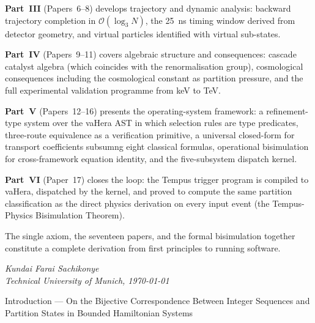 \documentclass[12pt,a4paper,openany]{book}
\begin{document}
\textbf{Part~III} (Papers~6--8) develops trajectory and dynamic analysis:
backward trajectory completion in $\mathcal{O}(\log_3 N)$, the 25~ns
timing window derived from detector geometry, and virtual particles
identified with virtual sub-states.

\textbf{Part~IV} (Papers~9--11) covers algebraic structure and
consequences: cascade catalyst algebra (which coincides with the
renormalisation group), cosmological consequences including the
cosmological constant as partition pressure, and the full experimental
validation programme from keV to TeV.

\textbf{Part~V} (Papers~12--16) presents the operating-system framework:
a refinement-type system over the vaHera AST in which selection rules are
type predicates, three-route equivalence as a verification primitive, a
universal closed-form for transport coefficients subsumng eight classical
formulas, operational bisimulation for cross-framework equation identity,
and the five-subsystem dispatch kernel.

\textbf{Part~VI} (Paper~17) closes the loop: the Tempus trigger program
is compiled to vaHera, dispatched by the kernel, and proved to compute the
same partition classification as the direct physics derivation on every input
event (the Tempus-Physics Bisimulation Theorem).

\vspace{1em}
\noindent The single axiom, the seventeen papers, and the formal bisimulation
together constitute a complete derivation from first principles to running
software.

\vspace{2em}
\noindent\hfill\textit{Kundai Farai Sachikonye}\\
\hfill\textit{Technical University of Munich, \today}

\clearpage


\clearpage

{}%
  {Introduction --- On the Bijective Correspondence Between Integer
   Sequences and Partition States in Bounded Hamiltonian Systems}



\end{document}
